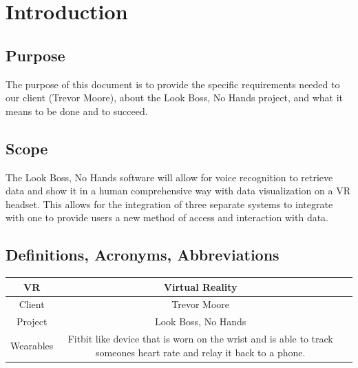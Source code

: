 \documentclass[onecolumn, draftclsnofoot,10pt, compsoc]{IEEEtran}
\begin{document}
\begin{titlepage}
\begin{singlespace}
\begin{abstract}
        \end{abstract}
    \end{singlespace}
\end{titlepage}
\newpage
{}
\tableofcontents
\clearpage


\section{Introduction}
    \subsection{Purpose}
        The purpose of this document is to provide the specific requirements needed to our client (Trevor Moore), about the Look Boss, No Hands project, and what it means to be done and to succeed. 
    
    \subsection{Scope}
        The Look Boss, No Hands software will allow for voice recognition to retrieve data and show it in a human comprehensive way with data visualization on a VR headset. This allows for the integration of three separate systems to integrate with one to provide users a new method of access and interaction with data.
    
    \subsection{Definitions, Acronyms, Abbreviations}
    
    \begin{center}
        \begin{tabular}{|c| c| c|}
            \hline
            VR & Virtual Reality \\
            \hline
            Client & Trevor Moore \\
            \hline 
            Project & Look Boss, No Hands \\
            \hline
            Wearables & Fitbit like device that is worn on the wrist and is able to track someones heart rate and relay it back to a phone.\\
            \hline
        \end{tabular}
    \end{center}
    
\end{document}
